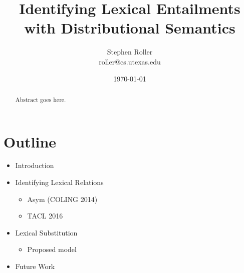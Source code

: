 \documentclass[letterpaper]{article}
\title{Identifying Lexical Entailments with Distributional Semantics}
\author{Stephen Roller\\
roller@cs.utexas.edu}
\date{\today}
\begin{document}
\maketitle

\begin{abstract}
  Abstract goes here.
\end{abstract}

\section{Outline}
\begin{itemize}
  \item Introduction
  \item Identifying Lexical Relations
    \begin{itemize}
      \item Asym (COLING 2014)
      \item TACL 2016
    \end{itemize}
  \item Lexical Substitution
    \begin{itemize}
      \item Proposed model
    \end{itemize}
  \item Future Work
\end{itemize}




\end{document}
